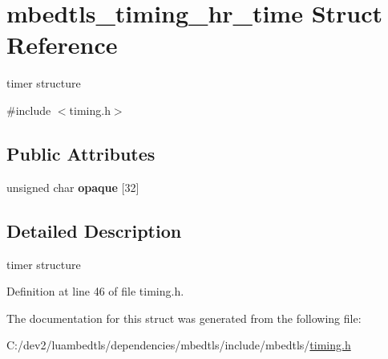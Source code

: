 \hypertarget{structmbedtls__timing__hr__time}{\section{mbedtls\-\_\-timing\-\_\-hr\-\_\-time Struct Reference}
\label{structmbedtls__timing__hr__time}
}


timer structure  




{\ttfamily \#include $<$timing.\-h$>$}

\subsection*{Public Attributes}
\begin{DoxyCompactItemize}
\item 
\hypertarget{structmbedtls__timing__hr__time_a5ad2da97c4ec844c558bb9a49d62ba2f}{unsigned char {\bfseries opaque} \mbox{[}32\mbox{]}}\label{structmbedtls__timing__hr__time_a5ad2da97c4ec844c558bb9a49d62ba2f}

\end{DoxyCompactItemize}


\subsection{Detailed Description}
timer structure 

Definition at line 46 of file timing.\-h.



The documentation for this struct was generated from the following file\-:\begin{DoxyCompactItemize}
\item 
C\-:/dev2/luambedtls/dependencies/mbedtls/include/mbedtls/\hyperlink{timing_8h}{timing.\-h}\end{DoxyCompactItemize}
